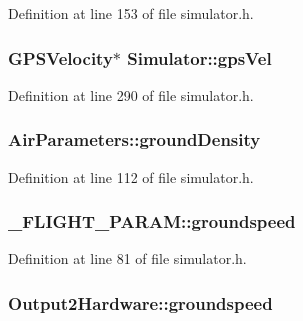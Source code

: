 Definition at line 153 of file simulator.\-h.

\hypertarget{group___h_i_t_l_plugin_ga649eab8811fb3f1e6596e48eac2d47c7}{
\subsubsection[{gps\-Vel}]{\setlength{\rightskip}{0pt plus 5cm}G\-P\-S\-Velocity$\ast$ Simulator\-::gps\-Vel\hspace{0.3cm}{\ttfamily [protected]}}}\label{group___h_i_t_l_plugin_ga649eab8811fb3f1e6596e48eac2d47c7}


Definition at line 290 of file simulator.\-h.

\hypertarget{group___h_i_t_l_plugin_ga450ddae855377cbc0ce591c7703bcf3f}{
\subsubsection[{ground\-Density}]{ Air\-Parameters\-::ground\-Density}}\label{group___h_i_t_l_plugin_ga450ddae855377cbc0ce591c7703bcf3f}


Definition at line 112 of file simulator.\-h.

\hypertarget{group___h_i_t_l_plugin_ga2a4535a23a5ca83f655298d2494556d5}{
\subsubsection[{groundspeed}]{ \-\_\-\-F\-L\-I\-G\-H\-T\-\_\-\-P\-A\-R\-A\-M\-::groundspeed}}\label{group___h_i_t_l_plugin_ga2a4535a23a5ca83f655298d2494556d5}


Definition at line 81 of file simulator.\-h.

\hypertarget{group___h_i_t_l_plugin_ga6cab485f36b93a2e86e248bcc6b240f1}{
\subsubsection[{groundspeed}]{ Output2\-Hardware\-::groundspeed}}\label{group___h_i_t_l_plugin_ga6cab485f36b93a2e86e248bcc6b240f1}


